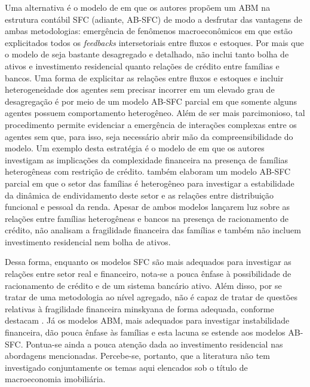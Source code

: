 Uma alternativa é o modelo de \textcite{caiani_agent_2016} em que os autores propõem um ABM na estrutura contábil SFC (adiante, AB-SFC) de modo a desfrutar das vantagens de ambas metodologias: emergência de fenômenos macroeconômicos em que estão explicitados todos os \textit{feedbacks} intersetoriais entre fluxos e estoques.
Por mais que o modelo de \textcite{caiani_agent_2016} seja bastante desagregado e detalhado, não inclui tanto bolha de ativos e investimento residencial quanto relações de crédito entre famílias e bancos.
Uma forma de explicitar as relações entre fluxos e estoques e incluir heterogeneidade dos agentes sem precisar incorrer em um elevado grau de desagregação é por meio de um modelo AB-SFC parcial em que somente alguns agentes possuem comportamento heterogêneo.
Além de ser mais parcimonioso, tal procedimento permite evidenciar a emergência de interações complexas entre os agentes sem que, para isso, seja necessário abrir mão da compreensibilidade do modelo.
Um exemplo desta estratégia é o modelo de \textcite{botta_when_2019} em que os autores investigam as implicações da complexidade financeira na presença de famílias heterogêneas com restrição de crédito.
\textcite{carvalho_income_2014} também elaboram um modelo AB-SFC parcial em que o setor das famílias é heterogêneo para investigar a estabilidade da dinâmica de endividamento deste setor e as relações entre distribuição funcional e pessoal da renda.
Apesar de ambos modelos lançarem luz sobre as relações entre famílias heterogêneas e bancos na presença de racionamento de crédito, não analisam a fragilidade financeira das famílias e também não 
incluem investimento residencial nem bolha de ativos. 


Dessa forma, enquanto os modelos SFC são mais adequados para investigar as relações entre setor real e financeiro, nota-se a pouca ênfase à possibilidade de racionamento de crédito e de um sistema bancário ativo. %
Além disso, por se tratar de uma metodologia ao nível agregado, não é capaz de tratar de questões relativas à fragilidade financeira minskyana de forma adequada, conforme destacam \textcite{bellofiore_minskys_2001}.
Já os modelos ABM, mais adequados para investigar instabilidade financeira, dão pouca ênfase às famílias e esta lacuna se estende aos modelos AB-SFC.
Pontua-se ainda a pouca atenção dada ao investimento residencial nas abordagens mencionadas.
Percebe-se, portanto, que a literatura não tem investigado conjuntamente os temas aqui elencados sob o título de macroeconomia imobiliária.

